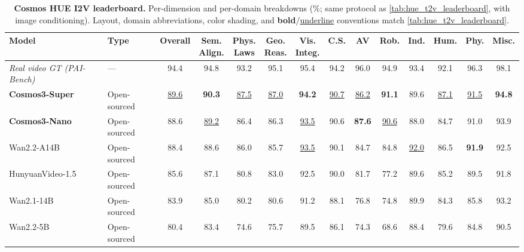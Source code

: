 \begin{table}[H]
  \centering
  \caption{\textbf{Cosmos HUE I2V leaderboard.} Per-dimension and per-domain breakdowns (\%; same protocol as \cref{tab:hue_t2v_leaderboard}, with image conditioning). Layout,
domain abbreviations, color shading, and \textbf{bold}/\underline{underline} conventions match \cref{tab:hue_t2v_leaderboard}.}
  \label{tab:hue_i2v_leaderboard}
  \footnotesize
  \setlength{\tabcolsep}{3pt}
  \renewcommand{\arraystretch}{1.15}
  \begin{tabular}{l l c cccc | ccccccc}
      \toprule
      \textbf{Model} & \textbf{Type} & \textbf{Overall}
      & \makecell{\textbf{Sem.}\\\textbf{Align.}} & \makecell{\textbf{Phys.}\\\textbf{Laws}} & \makecell{\textbf{Geo.}\\\textbf{Reas.}} & \makecell{\textbf{Vis.}\\\textbf{Integ.}}
      & \textbf{C.S.} & \textbf{AV} & \textbf{Rob.} & \textbf{Ind.} & \textbf{Hum.} & \textbf{Phy.} & \textbf{Misc.} \\
      \midrule
      \rowcolor{black!8}
      \emph{Real video GT (PAI-Bench)} & --- & 94.4 & 94.8 & 93.2 & 95.1 & 95.4 & 94.2 & 96.0 & 94.9 & 93.4 & 92.1 & 96.3 & 98.1 \\
      \midrule
      \rowcolor{rowours}
      \textbf{Cosmos3-Super} & Open-sourced & \underline{89.6} & \textbf{90.3} & \underline{87.5} & \underline{87.0} & \textbf{94.2} & \underline{90.7} & \underline{86.2} &
\textbf{91.1} & 89.6 & \underline{87.1} & \underline{91.5} & \textbf{94.8} \\
      \rowcolor{rowours}
      \textbf{Cosmos3-Nano} & Open-sourced & 88.6 & \underline{89.2} & 86.4 & 86.3 & \underline{93.5} & 90.6 & \textbf{87.6} & \underline{90.6} & 88.0 & 84.7 & 91.0 & 93.9 \\
      \midrule
      Wan2.2-A14B & Open-sourced & 88.4 & 88.6 & 86.0 & 85.7 & \underline{93.5} & 90.1 & 84.7 & 84.8 & \underline{92.0} & 86.5 & \textbf{91.9} & 92.5 \\
      HunyuanVideo-1.5 & Open-sourced & 85.6 & 87.1 & 80.8 & 83.0 & 92.5 & 90.0 & 81.7 & 77.2 & 89.6 & 85.2 & 89.5 & 91.8 \\
      Wan2.1-14B & Open-sourced & 83.9 & 85.0 & 80.2 & 80.6 & 91.2 & 88.1 & 76.8 & 74.8 & 89.9 & 84.3 & 85.8 & 93.2 \\
      Wan2.2-5B & Open-sourced & 80.4 & 83.4 & 74.6 & 75.7 & 89.5 & 86.1 & 74.3 & 68.6 & 88.4 & 79.6 & 84.8 & 90.5 \\

\end{tabular}
\end{table}
